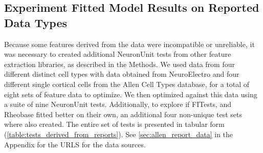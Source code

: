 




%






\subsection{Experiment Fitted Model Results on Reported Data Types} 
Because some features derived from the data were incompatible or unreliable, it was necessary to created additional NeuronUnit tests from other feature extraction libraries, as described in the Methods.
We used data from four different distinct cell types with data obtained from NeuroElectro and four different single cortical cells from the Allen Cell Types database, for a total of eight sets of feature data to optimize.
We then optimized against this data using a suite of nine NeuronUnit tests. Additionally, to explore if FITests, and Rheobase fitted better on their own, an additional four non-unique test sets where also created. The entire set of tests is presented in tabular form (\ref{table:tests_derived_from_reports}). See \ref{sec:allen_report_data} in the Appendix for the URLS for the data sources.


